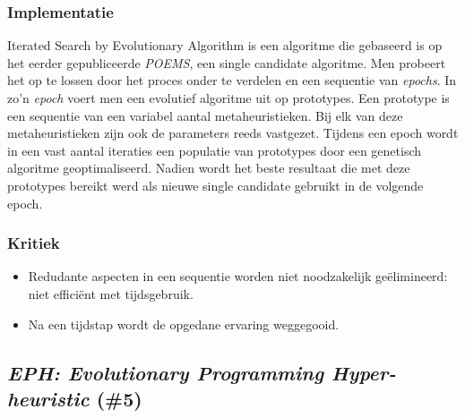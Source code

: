 \subsubsection{Implementatie}
Iterated Search by Evolutionary Algorithm\cite{chesc-isea} is een algoritme die gebaseerd is op het eerder gepubliceerde \emph{POEMS}\cite{eurogp06:KubalikFaigl}, een single candidate algoritme. Men probeert het op te lossen door het proces onder te verdelen en een sequentie van \emph{epochs}. In zo'n \emph{epoch} voert men een evolutief algoritme uit op prototypes. Een prototype is een sequentie van een variabel aantal metaheuristieken. Bij elk van deze metaheuristieken zijn ook de parameters reeds vastgezet. Tijdens een epoch wordt in een vast aantal iteraties een populatie van prototypes door een genetisch algoritme geoptimaliseerd. Nadien wordt het beste resultaat die met deze prototypes bereikt werd als nieuwe single candidate gebruikt in de volgende epoch. 
\subsubsection{Kritiek}
\begin{itemize}
 \item Redudante aspecten in een sequentie worden niet noodzakelijk ge\"elimineerd: niet effici\"ent met tijdsgebruik.
 \item Na een tijdstap wordt de opgedane ervaring weggegooid.
\end{itemize}
\subsection{\emph{EPH: Evolutionary Programming Hyper-heuristic} (\#5)}
\label{sss:eph}
